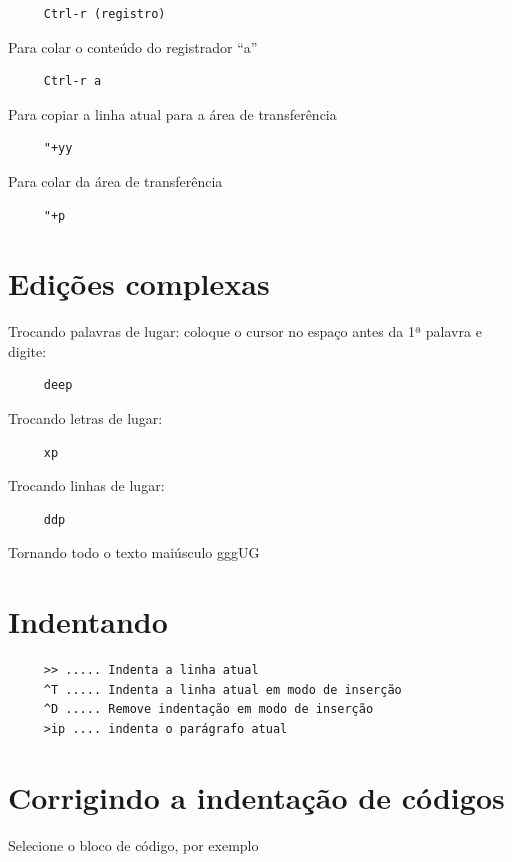 \documentclass[10pt,a4paper,openany]{book}
\begin{document}
\begin{verbatim}
     Ctrl-r (registro)
\end{verbatim}

Para colar o conteúdo do registrador ``a''

\begin{verbatim}
     Ctrl-r a
\end{verbatim}

Para copiar a linha atual para a área de transferência

\begin{verbatim}
     "+yy
\end{verbatim}

Para colar da área de transferência

\begin{verbatim}
     "+p
\end{verbatim}

\section{Edições complexas }
\label{Edições complexas }

Trocando palavras de lugar: coloque o cursor no espaço antes da 1ª palavra e digite:

\begin{verbatim}
     deep
\end{verbatim}

Trocando letras de lugar:

\begin{verbatim}
     xp
\end{verbatim}

Trocando linhas de lugar:

\begin{verbatim}
     ddp
\end{verbatim}

Tornando todo o texto maiúsculo
 gggUG

\section{Indentando }

\begin{verbatim}
     >> ..... Indenta a linha atual
     ^T ..... Indenta a linha atual em modo de inserção
     ^D ..... Remove indentação em modo de inserção
     >ip .... indenta o parágrafo atual
\end{verbatim}

\section{Corrigindo a indentação de códigos}
\label{Corrigindo a indentação de códigos}
Selecione o bloco de código, por exemplo
\end{document}
